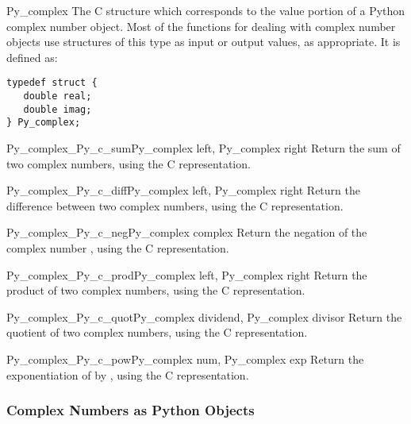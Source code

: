 \begin{ctypedesc}{Py_complex}
  The C structure which corresponds to the value portion of a Python
  complex number object.  Most of the functions for dealing with
  complex number objects use structures of this type as input or
  output values, as appropriate.  It is defined as:

\begin{verbatim}
typedef struct {
   double real;
   double imag;
} Py_complex;
\end{verbatim}
\end{ctypedesc}

\begin{cfuncdesc}{Py_complex}{_Py_c_sum}{Py_complex left, Py_complex right}
  Return the sum of two complex numbers, using the C
   representation.
\end{cfuncdesc}

\begin{cfuncdesc}{Py_complex}{_Py_c_diff}{Py_complex left, Py_complex right}
  Return the difference between two complex numbers, using the C
   representation.
\end{cfuncdesc}

\begin{cfuncdesc}{Py_complex}{_Py_c_neg}{Py_complex complex}
  Return the negation of the complex number , using the C
   representation.
\end{cfuncdesc}

\begin{cfuncdesc}{Py_complex}{_Py_c_prod}{Py_complex left, Py_complex right}
  Return the product of two complex numbers, using the C
   representation.
\end{cfuncdesc}

\begin{cfuncdesc}{Py_complex}{_Py_c_quot}{Py_complex dividend,
                                          Py_complex divisor}
  Return the quotient of two complex numbers, using the C
   representation.
\end{cfuncdesc}

\begin{cfuncdesc}{Py_complex}{_Py_c_pow}{Py_complex num, Py_complex exp}
  Return the exponentiation of  by , using the C
   representation.
\end{cfuncdesc}


\subsubsection{Complex Numbers as Python Objects}

